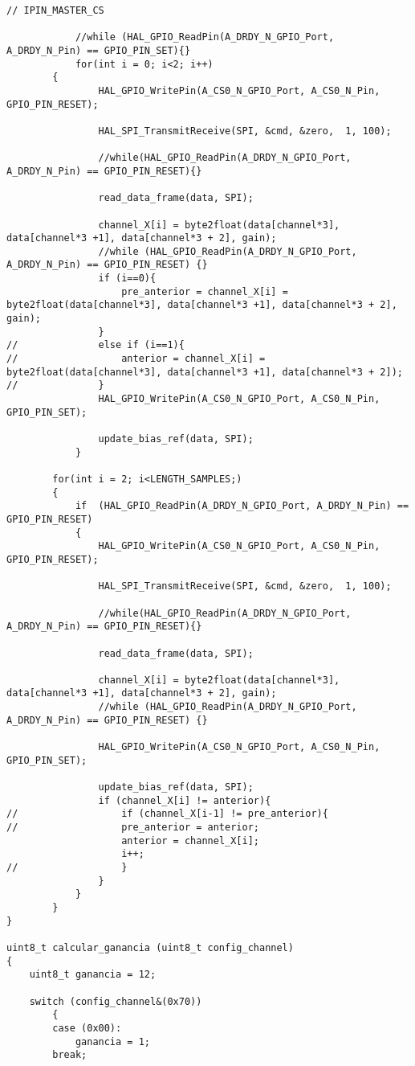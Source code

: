 \begin{lstlisting}[label=algoritmo:STM32F4:ADS1299.c,style = STM-code,frame=single,caption=STM32F4:ADS1299.c]
	// IPIN_MASTER_CS	
		
			//while (HAL_GPIO_ReadPin(A_DRDY_N_GPIO_Port, A_DRDY_N_Pin) == GPIO_PIN_SET){}
			for(int i = 0; i<2; i++)
		{
				HAL_GPIO_WritePin(A_CS0_N_GPIO_Port, A_CS0_N_Pin, GPIO_PIN_RESET);
					
				HAL_SPI_TransmitReceive(SPI, &cmd, &zero,  1, 100);
				
				//while(HAL_GPIO_ReadPin(A_DRDY_N_GPIO_Port, A_DRDY_N_Pin) == GPIO_PIN_RESET){}
				
				read_data_frame(data, SPI);
			
				channel_X[i] = byte2float(data[channel*3], data[channel*3 +1], data[channel*3 + 2], gain);
				//while (HAL_GPIO_ReadPin(A_DRDY_N_GPIO_Port, A_DRDY_N_Pin) == GPIO_PIN_RESET) {}			
				if (i==0){
					pre_anterior = channel_X[i] = byte2float(data[channel*3], data[channel*3 +1], data[channel*3 + 2], gain);
				}
//				else if (i==1){
//					anterior = channel_X[i] = byte2float(data[channel*3], data[channel*3 +1], data[channel*3 + 2]);
//				}
				HAL_GPIO_WritePin(A_CS0_N_GPIO_Port, A_CS0_N_Pin, GPIO_PIN_SET);
				
				update_bias_ref(data, SPI);
			}
		
		for(int i = 2; i<LENGTH_SAMPLES;)
		{
			if 	(HAL_GPIO_ReadPin(A_DRDY_N_GPIO_Port, A_DRDY_N_Pin) == GPIO_PIN_RESET)
			{
				HAL_GPIO_WritePin(A_CS0_N_GPIO_Port, A_CS0_N_Pin, GPIO_PIN_RESET);
					
				HAL_SPI_TransmitReceive(SPI, &cmd, &zero,  1, 100);
				
				//while(HAL_GPIO_ReadPin(A_DRDY_N_GPIO_Port, A_DRDY_N_Pin) == GPIO_PIN_RESET){}
				
				read_data_frame(data, SPI);
			
				channel_X[i] = byte2float(data[channel*3], data[channel*3 +1], data[channel*3 + 2], gain);
				//while (HAL_GPIO_ReadPin(A_DRDY_N_GPIO_Port, A_DRDY_N_Pin) == GPIO_PIN_RESET) {}			
					
				HAL_GPIO_WritePin(A_CS0_N_GPIO_Port, A_CS0_N_Pin, GPIO_PIN_SET);
				
				update_bias_ref(data, SPI);
				if (channel_X[i] != anterior){
//					if (channel_X[i-1] != pre_anterior){
//					pre_anterior = anterior;
					anterior = channel_X[i];
					i++;
//					}
				}
			}
		}
}
	
uint8_t calcular_ganancia (uint8_t config_channel)
{
	uint8_t ganancia = 12;
	
	switch (config_channel&(0x70))
		{
		case (0x00):
			ganancia = 1;
		break;
		

\end{lstlisting}
